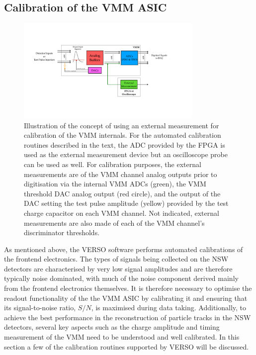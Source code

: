 \subsection{Calibration of the VMM ASIC}
\label{sec:calib_alg}

\begin{figure}[!htb]
    \begin{center}
        \includegraphics[width=0.8\textwidth]{figures/nsw/calibration/xadc_diagramPDF}
        \caption{
            Illustration of the concept of using an external measurement for calibration
            of the VMM internals.
            For the automated calibration routines described in the text, the ADC provided
            by the FPGA is used as the external measurement device but an oscilloscope probe can be used
            as well.
            For calibration purposes, the external measurements are of the VMM channel analog outputs prior
            to digitisation via the internal VMM ADCs
            (green), the VMM threshold DAC analog output (red circle), and the
            output of the DAC setting the test pulse amplitude (yellow) provided by the test charge capacitor
            on each VMM channel.
            Not indicated, external measurements are also made of each of the VMM channel's discriminator thresholds.
        }
        \label{fig:xadc_diagram}
    \end{center}
\end{figure}

As mentioned above, the VERSO software performs automated calibrations of
the frontend electronics.
The types of signals being collected on the NSW detectors are characterised by
very low signal amplitudes and are therefore typically noise dominated, with
much of the noise component derived mainly from the frontend electronics themselves.
It is therefore necessary to optimise the readout functionality of the
the VMM ASIC by calibrating it and ensuring that its signal-to-noise
ratio, $S/N$, is maximised during data taking.
Additionally, to achieve the best performance in the reconstruction of particle
tracks in the NSW detectors, several key aspects such as the charge amplitude
and timing measurement of the VMM need to be understood and well calibrated.
In this section a few of the calibration routines supported by VERSO will be discussed.

